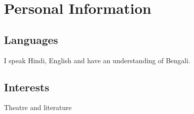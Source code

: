 \documentclass{article}
\begin{document}
\section{Personal Information}

\subsection{Languages}
I speak Hindi, English
and have an understanding of Bengali.
\subsection{Interests}
Theatre and literature
\end{document}
